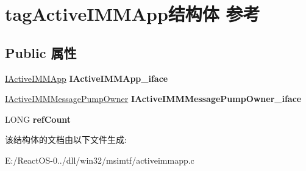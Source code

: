 \hypertarget{structtag_active_i_m_m_app}{}\section{tag\+Active\+I\+M\+M\+App结构体 参考}
\label{structtag_active_i_m_m_app}
\subsection*{Public 属性}
\begin{DoxyCompactItemize}
\item 
\mbox{\label{structtag_active_i_m_m_app_a208f5262185a1719b260d5a736f45b20}} 
\hyperlink{interface_i_active_i_m_m_app}{I\+Active\+I\+M\+M\+App} {\bfseries I\+Active\+I\+M\+M\+App\+\_\+iface}
\item 
\mbox{\label{structtag_active_i_m_m_app_a1958ec23402a26fe201e43598a6daca5}} 
\hyperlink{interface_i_active_i_m_m_message_pump_owner}{I\+Active\+I\+M\+M\+Message\+Pump\+Owner} {\bfseries I\+Active\+I\+M\+M\+Message\+Pump\+Owner\+\_\+iface}
\item 
\mbox{\label{structtag_active_i_m_m_app_a2cc2a91b503be35f2bd03152f31b9af9}} 
L\+O\+NG {\bfseries ref\+Count}
\end{DoxyCompactItemize}


该结构体的文档由以下文件生成\+:\begin{DoxyCompactItemize}
\item 
E\+:/\+React\+O\+S-\/0../dll/win32/msimtf/activeimmapp.\+c\end{DoxyCompactItemize}
